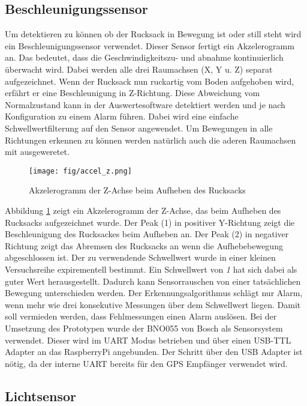 \documentclass{sigchi}
\begin{document}
\subsection{Beschleunigungssensor}
Um detektieren zu können ob der Rucksack in Bewegung ist oder
still steht wird ein Beschleunigungssensor verwendet. Dieser
Sensor fertigt ein Akzelerogramm an. Das bedeutet, dass die
Geschwindigkeitszu- und abnahme kontinuierlich überwacht wird.
Dabei werden alle drei Raumachsen (X, Y u. Z) separat aufgezeichnet.
Wenn der Rucksack nun ruckartig vom Boden aufgehoben wird, erfährt er
eine Beschleunigung in Z-Richtung. Diese Abweichung vom
Normalzustand kann in der Auswertesoftware detektiert werden
und je nach Konfiguration zu einem Alarm führen. Dabei wird 
eine einfache Schwellwertfilterung auf den Sensor angewendet.
Um Bewegungen in alle Richtungen erkennen zu können werden natürlich
auch die aderen Raumachsen mit ausgeweretet.

\begin{figure}
\centering
  \texttt{[image: fig/accel\_z.png]}
  \caption{Akzelerogramm der Z-Achse beim Aufheben des Rucksacks}
  \label{fig:accel_z}
\end{figure}

Abbildung \ref{fig:accel_z} zeigt ein Akzelerogramm der Z-Achse,
das beim Aufheben des Rucksacks aufgezeichnet wurde. Der Peak (1)
in positiver Y-Richtung zeigt die Beschleunigung des Rucksackes
beim Aufheben an. Der Peak (2) in negativer Richtung zeigt das
Abremsen des Rucksacks an wenn die Aufhebebewegung abgeschlossen
ist. Der zu verwendende Schwellwert wurde in einer kleinen
Versuchsreihe expirementell bestimmt. Ein Schwellwert von \textit{1}
hat sich dabei als guter Wert herausgestellt. Dadurch kann
Sensorrauschen von einer tatsächlichen Bewegung unterschieden
werden. Der Erkennungsalgorithmus schlägt nur Alarm, wenn mehr
wie drei konsekutive Messungen über dem Schwellwert liegen. Damit
soll vermieden werden, dass Fehlmessungen einen Alarm auslösen.
Bei der Umsetzung des Prototypen wurde der BNO055 \cite{Bosch:BNO055}
von Bosch als Sensorsystem verwendet. Dieser wird im UART Modus
betrieben und über einen USB-TTL Adapter an das RaspberryPi
angebunden. Der Schritt über den USB Adapter ist nötig, da der
interne UART bereits für den GPS Empfänger verwendet wird.

\subsection{Lichtsensor}
\end{document}
